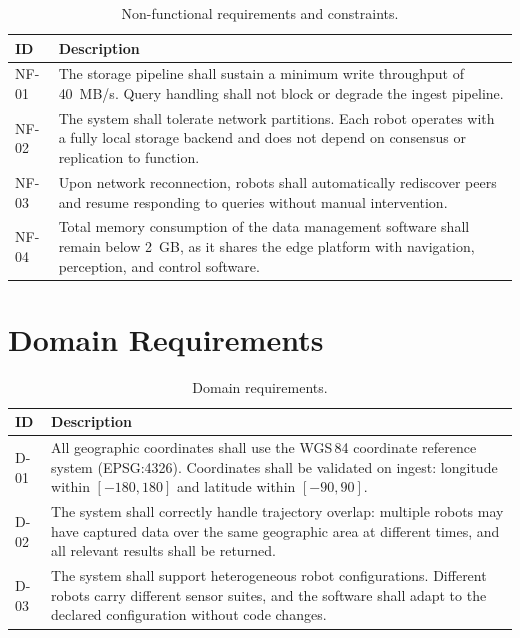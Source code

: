 \begin{table}[H]
\centering
\caption{Non-functional requirements and constraints.}
\label{tab:non-functional-requirements}
\begin{tabular}{l p{10cm}}
\hline
\textbf{ID} & \textbf{Description} \\
\hline
NF-01 & The storage pipeline shall sustain a minimum write throughput of 40~MB/s. Query handling shall not block or degrade the ingest pipeline. \\
NF-02 & The system shall tolerate network partitions. Each robot operates with a fully local storage backend and does not depend on consensus or replication to function. \\
NF-03 & Upon network reconnection, robots shall automatically rediscover peers and resume responding to queries without manual intervention. \\
NF-04 & Total memory consumption of the data management software shall remain below 2~GB, as it shares the edge platform with navigation, perception, and control software. \\
\hline
\end{tabular}
\end{table}


\section{Domain Requirements} \label{sec:domain-requirements}

\begin{table}[H]
\centering
\caption{Domain requirements.}
\label{tab:domain-requirements}
\begin{tabular}{l p{10cm}}
\hline
\textbf{ID} & \textbf{Description} \\
\hline
D-01 & All geographic coordinates shall use the WGS\,84 coordinate reference system (EPSG:4326). Coordinates shall be validated on ingest: longitude within $[-180, 180]$ and latitude within $[-90, 90]$. \\
D-02 & The system shall correctly handle trajectory overlap: multiple robots may have captured data over the same geographic area at different times, and all relevant results shall be returned. \\
D-03 & The system shall support heterogeneous robot configurations. Different robots carry different sensor suites, and the software shall adapt to the declared configuration without code changes. \\
\hline
\end{tabular}
\end{table}


